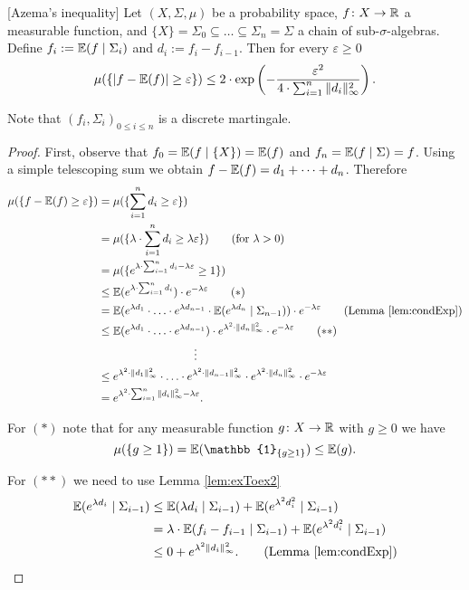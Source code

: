 \begin{lemma}\label{lem:azema}[Azema's inequality]
Let $(X,\Sigma,\mu)$ be a probability space, $f\colon X\to\mathbb{R}$ a measurable function, and $\{X\}=\Sigma_0\subseteq\dots\subseteq\Sigma_n=\Sigma$ a chain of sub-$\sigma$-algebras. Define $f_i:=\mathbb{E}(f\mid\Sigma_i)$ and $d_i:=f_i-f_{i-1}$. Then for every $\varepsilon\geq0$
\[\mu(\{|f-\mathbb{E}(f)|\geq \varepsilon\})\leq 2\cdot\exp\left(-\frac{\varepsilon^2}{4\cdot\sum_{i=1}^{n}\|d_i\|^2_\infty}\right).\]
\end{lemma}
Note that $(f_i,\Sigma_i)_{0\leq i\leq n}$ is a discrete martingale. 
\begin{proof} First, observe that $f_0=\mathbb{E}(f\mid \{X\})=\mathbb{E}(f)$ and $f_n=\mathbb{E}(f\mid\Sigma)=f$. Using a simple telescoping sum we obtain $f-\mathbb{E}(f)=d_1+\dots+d_n$. Therefore
\begin{align*}
\mu(\{f-\E(f)\geq \varepsilon\})&=\mu(\{\sum_{i=1}^{n}d_i\geq  \varepsilon\})\\
&=\mu(\{\lambda\cdot\sum_{i=1}^{n}d_i\geq \lambda \varepsilon\})\tag{for $\lambda>0$}\\
&=\mu(\{e^{\lambda\cdot\sum_{i=1}^{n}d_i-\lambda \varepsilon}\geq 1\})\\
&\leq\E(e^{\lambda\cdot\sum_{i=1}^{n}d_i})\cdot e^{-\lambda \varepsilon}\tag{$\ast$}\\
&=\E(e^{\lambda d_1}\cdot\ldots\cdot e^{\lambda d_{n-1}}\cdot\E(e^{\lambda d_n}\mid \Sigma_{n-1}))\cdot e^{-\lambda \varepsilon}\tag{Lemma \ref{lem:condExp}}\\
&\leq\E(e^{\lambda d_1}\cdot\ldots\cdot e^{\lambda d_{n-1}})\cdot e^{\lambda^2\cdot \|d_n\|^2_\infty}\cdot e^{-\lambda \varepsilon}\tag{$\ast\ast$}\\
&\hspace{3cm}\vdots\\
&\leq e^{\lambda^2\cdot \|d_1\|^2_\infty}\cdot\ldots\cdot e^{\lambda^2\cdot \|d_{n-1}\|^2_\infty}\cdot e^{\lambda^2\cdot \|d_n\|^2_\infty}\cdot e^{-\lambda \varepsilon}\\
&=e^{\lambda^2\cdot\sum_{i=1}^n\|d_i\|^2_\infty-\lambda \varepsilon}.
\end{align*}

For $(\ast)$ note that for any measurable function $g\colon X\to\mathbb{R}$ with $g\geq0$ we have %
\[\mu(\{g\geq1\})=\E(\mathbb{1}_{\{g\geq1\}})\leq\E(g).\]

For $(\ast\ast)$ we need to use Lemma \ref{lem:exToex2}
\begin{align*}
\E(e^{\lambda d_i}\mid \Sigma_{i-1})&\leq \E(\lambda d_i\mid\Sigma_{i-1})+\E(e^{\lambda^2 d^2_i}\mid\Sigma_{i-1})\\
&=\lambda\cdot\E( f_i-f_{i-1}\mid\Sigma_{i-1}) + \E(e^{\lambda^2 d^2_i}\mid\Sigma_{i-1})\\
&\leq 0 + e^{\lambda^2 \|d_i\|_\infty^2}.\tag{Lemma \ref{lem:condExp}}
\end{align*}


\end{proof}

